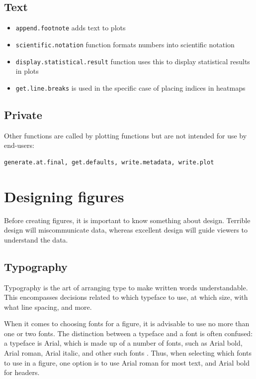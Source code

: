 \documentclass[letterpaper]{article}\usepackage[]{graphicx}\usepackage[]{color}
\begin{document}
\subsection{Text}
\begin{itemize}
\item \texttt{append.footnote} adds text to plots
\item \texttt{scientific.notation} function formats numbers into scientific notation
\item \texttt{display.statistical.result} function uses this to display statistical results in plots
\item \texttt{get.line.breaks} is used in the specific case of placing indices in heatmaps
\end{itemize}

\subsection{Private}
Other functions are called by plotting functions but are not intended for use by end-users: 
\begin{verbatim}
generate.at.final, get.defaults, write.metadata, write.plot
\end{verbatim}

\section{Designing figures}
Before creating figures, it is important to know something about design. Terrible design will miscommunicate data, whereas excellent design will guide viewers to understand the data\cite{tufte}. 

\subsection{Typography}
Typography is the art of arranging type to make written words understandable. This encompasses decisions related to which typeface to use, at which size, with what line spacing, and more. 

When it comes to choosing fonts for a figure, it is advisable to use no more than one or two fonts. The distinction between a typeface and a font is often confused: a typeface is Arial, which is made up of a number of fonts, such as Arial bold, Arial roman, Arial italic, and other such fonts \cite{wong-type}. Thus, when selecting which fonts to use in a figure, one option is to use Arial roman for most text, and Arial bold for headers.
\end{document}
